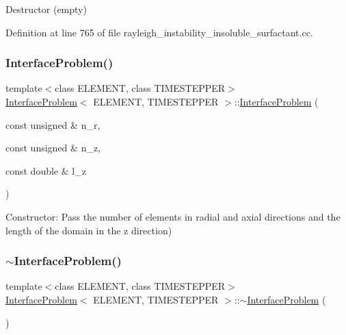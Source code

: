 Destructor (empty) 



Definition at line 765 of file rayleigh\+\_\+instability\+\_\+insoluble\+\_\+surfactant.\+cc.

\mbox{\label{classInterfaceProblem_af1ab49eb511b5a8db27e7b4e509a0c5c}} 
\subsubsection{\texorpdfstring{Interface\+Problem()}{InterfaceProblem()}\hspace{0.1cm}{\footnotesize\ttfamily [3/3]}}
{\footnotesize\ttfamily template$<$class E\+L\+E\+M\+E\+NT, class T\+I\+M\+E\+S\+T\+E\+P\+P\+ER$>$ \\
\hyperlink{classInterfaceProblem}{Interface\+Problem}$<$ E\+L\+E\+M\+E\+NT, T\+I\+M\+E\+S\+T\+E\+P\+P\+ER $>$\+::\hyperlink{classInterfaceProblem}{Interface\+Problem} (\begin{DoxyParamCaption}\item[{const unsigned \&}]{n\+\_\+r,  }\item[{const unsigned \&}]{n\+\_\+z,  }\item[{const double \&}]{l\+\_\+z }\end{DoxyParamCaption})}

Constructor\+: Pass the number of elements in radial and axial directions and the length of the domain in the z direction) \mbox{\label{classInterfaceProblem_a90c191f8046069099b199743e7ce7111}} 
\subsubsection{\texorpdfstring{$\sim$\+Interface\+Problem()}{~InterfaceProblem()}\hspace{0.1cm}{\footnotesize\ttfamily [2/2]}}
{\footnotesize\ttfamily template$<$class E\+L\+E\+M\+E\+NT, class T\+I\+M\+E\+S\+T\+E\+P\+P\+ER$>$ \\
\hyperlink{classInterfaceProblem}{Interface\+Problem}$<$ E\+L\+E\+M\+E\+NT, T\+I\+M\+E\+S\+T\+E\+P\+P\+ER $>$\+::$\sim$\hyperlink{classInterfaceProblem}{Interface\+Problem} (\begin{DoxyParamCaption}{ }\end{DoxyParamCaption})\hspace{0.3cm}{\ttfamily [inline]}}



